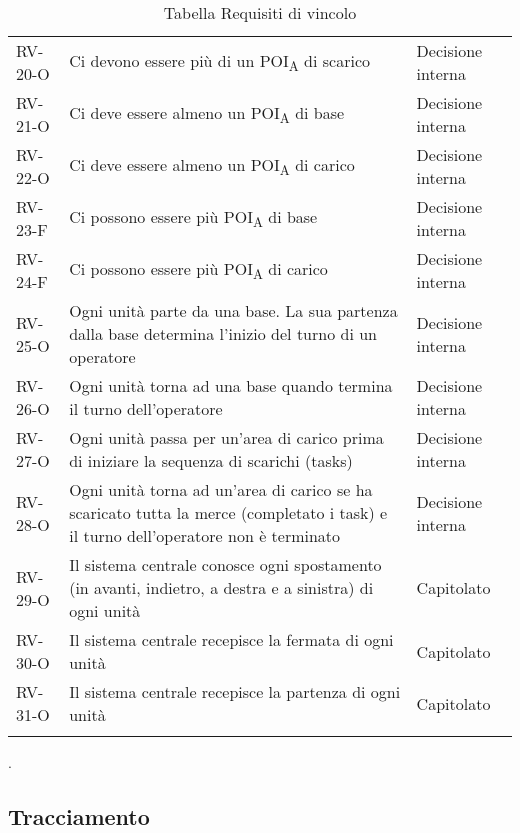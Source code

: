 \begin{longtable}{ 
		>{}p{} 
		>{}p{}
		>{\centering}p{} }
RV-20-O & Ci devono essere più di un \acrshort{POI}\textsubscript{A} di scarico & Decisione interna\tabularnewline
RV-21-O & Ci deve essere almeno un \acrshort{POI}\textsubscript{A} di base & Decisione interna\tabularnewline
RV-22-O & Ci deve essere almeno un \acrshort{POI}\textsubscript{A} di carico & Decisione interna\tabularnewline
RV-23-F & Ci possono essere più \acrshort{POI}\textsubscript{A} di base & Decisione interna\tabularnewline
RV-24-F & Ci possono essere più \acrshort{POI}\textsubscript{A} di carico & Decisione interna\tabularnewline
RV-25-O & Ogni unità parte da una base. La sua partenza dalla base determina l'inizio del turno di un operatore & Decisione interna\tabularnewline
RV-26-O & Ogni unità torna ad una base quando termina il turno dell’operatore & Decisione interna\tabularnewline
RV-27-O & Ogni unità passa per un’area di carico prima di iniziare la sequenza di scarichi (tasks) & Decisione interna\tabularnewline
RV-28-O & Ogni unità torna ad un'area di carico se ha scaricato tutta la merce (completato i task) e il turno dell’operatore non è terminato & Decisione interna\tabularnewline
RV-29-O & Il sistema centrale conosce ogni spostamento (in avanti, indietro, a destra e a sinistra) di ogni unità & Capitolato\tabularnewline
RV-30-O & Il sistema centrale recepisce la fermata di ogni unità & Capitolato\tabularnewline
RV-31-O & Il sistema centrale recepisce la partenza di ogni unità & Capitolato\tabularnewline
\caption{Tabella Requisiti di vincolo\label{ Tabella Requisiti di vincolo}}\\
\end{longtable}.
\pagebreak
\subsection{Tracciamento}
